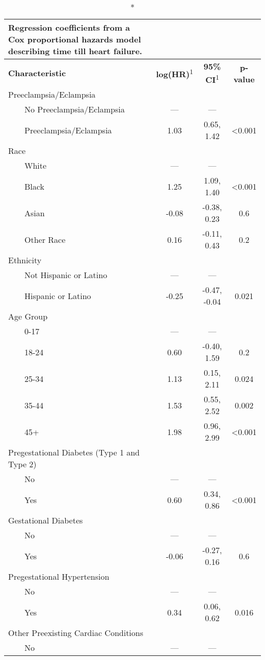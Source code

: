 \setlength{\LTpost}{0mm}
\begin{longtable}{lccc}
\caption*{
{\large \textbf{Regression coefficients from a Cox proportional hazards model describing time till heart failure.}}
} \\ 
\toprule
\textbf{Characteristic} & \textbf{log(HR)}\textsuperscript{1} & \textbf{95\% CI}\textsuperscript{1} & \textbf{p-value} \\ 
\midrule
Preeclampsia/Eclampsia &  &  &  \\ 
    No Preeclampsia/Eclampsia & — & — &  \\ 
    Preeclampsia/Eclampsia & 1.03 & 0.65, 1.42 & <0.001 \\ 
Race &  &  &  \\ 
    White & — & — &  \\ 
    Black & 1.25 & 1.09, 1.40 & <0.001 \\ 
    Asian & -0.08 & -0.38, 0.23 & 0.6 \\ 
    Other Race & 0.16 & -0.11, 0.43 & 0.2 \\ 
Ethnicity &  &  &  \\ 
    Not Hispanic or Latino & — & — &  \\ 
    Hispanic or Latino & -0.25 & -0.47, -0.04 & 0.021 \\ 
Age Group &  &  &  \\ 
    0-17 & — & — &  \\ 
    18-24 & 0.60 & -0.40, 1.59 & 0.2 \\ 
    25-34 & 1.13 & 0.15, 2.11 & 0.024 \\ 
    35-44 & 1.53 & 0.55, 2.52 & 0.002 \\ 
    45+ & 1.98 & 0.96, 2.99 & <0.001 \\ 
Pregestational Diabetes (Type 1 and Type 2) &  &  &  \\ 
    No & — & — &  \\ 
    Yes & 0.60 & 0.34, 0.86 & <0.001 \\ 
Gestational Diabetes &  &  &  \\ 
    No & — & — &  \\ 
    Yes & -0.06 & -0.27, 0.16 & 0.6 \\ 
Pregestational Hypertension &  &  &  \\ 
    No & — & — &  \\ 
    Yes & 0.34 & 0.06, 0.62 & 0.016 \\ 
Other Preexisting Cardiac Conditions &  &  &  \\ 
    No & — & — &  \\ 

\end{longtable}
